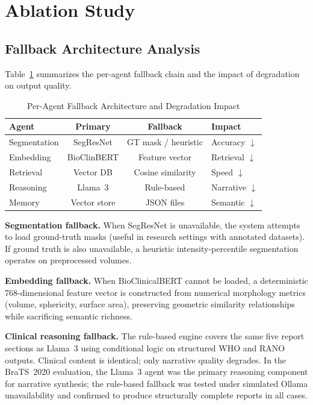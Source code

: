 \documentclass[journal]{IEEEtran}
\begin{document}
\FloatBarrier
\section{Ablation Study}

\subsection{Fallback Architecture Analysis}

Table~\ref{tab:fallback} summarizes the per-agent fallback chain and the
impact of degradation on output quality.

\begin{table}[h]
\centering
\caption{Per-Agent Fallback Architecture and Degradation Impact}
\label{tab:fallback}
\begin{tabular}{lccp{2.2cm}}
\toprule
\textbf{Agent} & \textbf{Primary} & \textbf{Fallback} & \textbf{Impact} \\
\midrule
Segmentation & SegResNet    & GT mask / heuristic & Accuracy $\downarrow$ \\
Embedding    & BioClinBERT  & Feature vector      & Retrieval $\downarrow$ \\
Retrieval    & Vector DB    & Cosine similarity   & Speed $\downarrow$ \\
Reasoning    & Llama~3      & Rule-based          & Narrative $\downarrow$ \\
Memory       & Vector store & JSON files          & Semantic $\downarrow$ \\
\bottomrule
\end{tabular}
\end{table}

\textbf{Segmentation fallback.} When SegResNet is unavailable, the system
attempts to load ground-truth masks (useful in research settings with
annotated datasets). If ground truth is also unavailable, a heuristic
intensity-percentile segmentation operates on preprocessed volumes.

\textbf{Embedding fallback.} When BioClinicalBERT cannot be loaded, a
deterministic 768-dimensional feature vector is constructed from numerical
morphology metrics (volume, sphericity, surface area), preserving geometric
similarity relationships while sacrificing semantic richness.

\textbf{Clinical reasoning fallback.} The rule-based engine covers the
same five report sections as Llama~3 using conditional logic on structured
WHO and RANO outputs. Clinical content is identical; only narrative quality
degrades. In the BraTS~2020 evaluation, the Llama~3 agent was the primary
reasoning component for narrative synthesis; the rule-based fallback was
tested under simulated Ollama unavailability and confirmed to produce
structurally complete reports in all cases.
\end{document}
